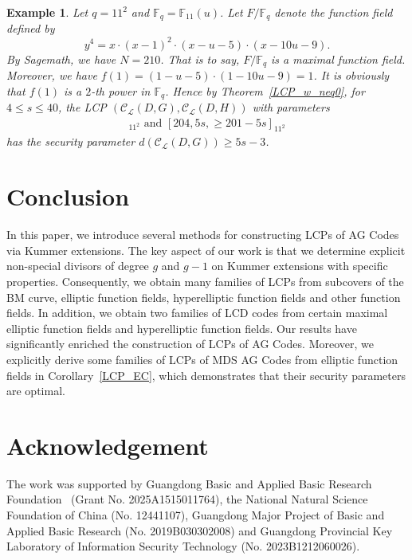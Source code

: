 \documentclass[journal,12pt,onecolumn]{IEEEtran}
\newtheorem{example}[theorem]{Example}
\begin{document}
\begin{example}\label{LCP_w_neq0_ex}
    Let $q = 11^2$ and $\mathbb{F}_q = \mathbb{F}_{11}(u)$. Let $F/\mathbb{F}_q$ denote the function field defined by 
    \[
        y^4 = x \cdot(x-1)^2\cdot(x-u-5)\cdot(x - 10u-9). 
    \]
    By Sagemath, we have $N = 210$. That is to say, $F/\mathbb{F}_q$ is a maximal function field. Moreover, we have $f(1) = (1-u-5)\cdot(1 - 10u-9) = 1$. It is obviously that $f(1)$ is a $2$-th power in $\mathbb{F}_q$. Hence by Theorem~\ref{LCP_w_neq0}, for $4\le s \le40$, the LCP $(\mathcal{C}_{\mathcal{L}}(D,G),\mathcal{C}_{\mathcal{L}}(D,H))$ with parameters
        \begin{gather*}
            [204,204-5s,\ge 5s-3]_{11^2}\text{ and }[204,5s,\ge 201-5s]_{11^2}
        \end{gather*}
    has the security parameter $d(\mathcal{C}_{\mathcal{L}}(D,G))\ge 5s-3$. 
\end{example}


\section{Conclusion}\label{conclusion}

In this paper, we introduce several methods for constructing LCPs of AG Codes via Kummer extensions. The key aspect of our work is that we determine explicit non-special divisors of degree $g$ and $g-1$ on Kummer extensions with specific properties. Consequently, we obtain many families of LCPs from subcovers of the BM curve, elliptic function fields, hyperelliptic function fields and other function fields. In addition, we obtain two families of LCD codes from certain maximal elliptic function fields and hyperelliptic function fields. Our results have significantly enriched the construction of LCPs of AG Codes. Moreover, we explicitly derive some families of LCPs of MDS AG Codes from elliptic function fields in Corollary~\ref{LCP_EC}, which demonstrates that their security parameters are optimal. 




\section*{Acknowledgement}

The work was supported by Guangdong Basic and Applied Basic Research Foundation~ (Grant No. 2025A1515011764), the National Natural Science Foundation of China (No. 12441107),  Guangdong Major Project of Basic and Applied Basic Research (No. 2019B030302008) and Guangdong Provincial Key Laboratory of Information Security Technology (No. 2023B1212060026). 













\end{document}

